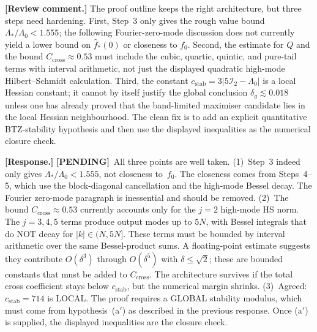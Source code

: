 \documentclass[12pt]{article}
\theoremstyle{definition}
\theoremstyle{remark}
\newcommand{\review}[1]{\par\smallskip\noindent\textbf{\color{red}[Review comment.]} {\color{red}#1}\par\smallskip}
\newcommand{\response}[1]{\par\noindent\textbf{\color{blue}[Response.]} {\color{blue}#1}\par\smallskip}
\newcommand{\pending}{\textbf{\color{orange}[PENDING]}}
\begin{document}
\review{The proof outline keeps the right architecture, but three steps
need hardening.  First, Step~3 only gives the rough value bound
$\Lambda_*/\Lambda_0<1.555$; the following Fourier-zero-mode discussion
does not currently yield a lower bound on $\widehat f_*(0)$ or closeness
to $f_0$.  Second, the estimate for $Q$ and the bound
$C_{\mathrm{cross}}\approx0.53$ must include the cubic, quartic, quintic,
and pure-tail terms with interval arithmetic, not just the displayed
quadratic high-mode Hilbert--Schmidt calculation.  Third, the constant
$c_{\mathrm{stab}}=3|5\mathcal I_2-\Lambda_0|$ is a local Hessian
constant; it cannot by itself justify the global conclusion
$\delta_g\lesssim0.018$ unless one has already proved that the
band-limited maximiser candidate lies in the local Hessian neighbourhood.
The clean fix is to add an explicit quantitative BTZ-stability hypothesis
and then use the displayed inequalities as the numerical closure check.}

\response{\pending\ All three points are well taken.
(1)~Step~3 indeed only gives $\Lambda_*/\Lambda_0<1.555$, not closeness
to~$f_0$.  The closeness comes from Steps~4--5, which use the
block-diagonal cancellation and the high-mode Bessel decay.  The Fourier
zero-mode paragraph is inessential and should be removed.
(2)~The bound $C_{\mathrm{cross}}\approx 0.53$ currently accounts only
for the $j=2$ high-mode HS norm.  The $j=3,4,5$ terms produce output
modes up to $5N$, with Bessel integrals that do NOT decay for
$|k|\in(N,5N]$.  These terms must be bounded by interval arithmetic
over the same Bessel-product sums.  A floating-point estimate suggests
they contribute $O(\delta^3)$ through $O(\delta^5)$ with
$\delta\leq\sqrt{2}$; these are bounded constants that must be added
to $C_{\mathrm{cross}}$.  The architecture survives if the total
cross coefficient stays below $c_{\mathrm{stab}}$, but the numerical
margin shrinks.
(3)~Agreed: $c_{\mathrm{stab}}=714$ is LOCAL.  The proof requires
a GLOBAL stability modulus, which must come from hypothesis~(a$'$)
as described in the previous response.  Once (a$'$) is supplied, the
displayed inequalities are the closure check.}
\end{document}
